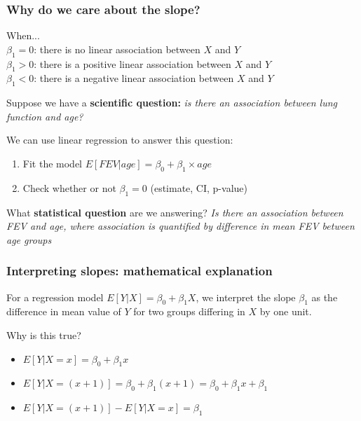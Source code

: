 \documentclass[12pt, 
hyperref={colorlinks=true, linkcolor=blue, urlcolor=cyan},dvipsnames]{beamer}
\begin{document}
\begin{frame}
\frametitle{Why do we care about the slope?}

When... \\
$\beta_1 = 0$: there is no linear association between $X$ and $Y$ \\
$\beta_1 > 0$: there is a positive linear association between $X$ and $Y$ \\
$\beta_1 < 0$: there is a negative linear association between $X$ and $Y$

\pause
Suppose we have a \textbf{scientific question:} \textit{is there an association between lung function and age?}

We can use linear regression to answer this question: \vspace{-0.3cm}
\begin{enumerate}
\item Fit the model $E[FEV|age] = \beta_0 + \beta_1 \times age$
\item Check whether or not $\beta_1 = 0$ \color{blue} (estimate, CI, p-value) \color{black}
\end{enumerate}

\pause
What \textbf{statistical question} are we answering? \textit{Is there an association between FEV and age, where association is quantified by difference in mean FEV between age groups}

\end{frame} 


\begin{frame}
\frametitle{Interpreting slopes: mathematical explanation}

For a regression model $E[Y|X] = \beta_0 + \beta_1 X$, \color{blue} we interpret the slope $\beta_1$ as the difference in mean value of $Y$ for two groups differing in $X$ by one unit. \color{black}

Why is this true?
\begin{itemize}
\item $E[Y|X = x] = \beta_0 + \beta_1 x$ \pause
\item $E[Y|X = (x+1)] = \beta_0 + \beta_1(x+1) = \beta_0 + \beta_1 x + \beta_1$ \pause
\item $E[Y|X = (x+1)] - E[Y|X = x] = \beta_1$
\end{itemize}

\end{frame}
\end{document}
